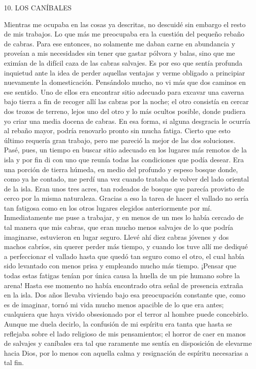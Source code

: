 \documentclass{novela}
\begin{document}
    10. LOS CANÍBALES




    Mientras me ocupaba en las cosas ya descritas, no descuidé sin embargo el resto de mis trabajos. Lo que más me preocupaba era la cuestión del pequeño rebaño de cabras. Para ese entonces, no solamente me daban carne en abundancia y proveían a mis necesidades sin tener que gastar pólvora y balas, sino que me eximían de la difícil caza de las cabras salvajes. Es por eso que sentía profunda inquietud ante la idea de perder aquellas ventajas y verme obligado a principiar nuevamente la domesticación.
    Pensándolo mucho, no vi más que dos caminos en ese sentido. Uno de ellos era encontrar sitio adecuado para excavar una caverna bajo tierra a fin de recoger allí las cabras por la noche; el otro consistía en cercar dos trozos de terreno, lejos uno del otro y lo más ocultos posible, donde pudiera yo criar una media docena de cabras. En esa forma, si alguna desgracia le ocurría al rebaño mayor, podría renovarlo pronto sin mucha fatiga. Cierto que esto último requería gran trabajo, pero me pareció la mejor de las dos soluciones.
    Pasé, pues, un tiempo en buscar sitio adecuado en los lugares más remotos de la isla y por fin di con uno que reunía todas las condiciones que podía desear. Era una porción de tierra húmeda, en medio del profundo y espeso bosque donde, como ya he contado, me perdí una vez cuando trataba de volver del lado oriental de la isla. Eran unos tres acres, tan rodeados de bosque que parecía provisto de cerco por la misma naturaleza. Gracias a eso la tarea de hacer el vallado no sería tan fatigosa como en los otros lugares elegidos anteriormente por mí.
    Inmediatamente me puse a trabajar, y en menos de un mes lo había cercado de tal manera que mis cabras, que eran mucho menos salvajes de lo que podría imaginarse, estuvieron en lugar seguro. Llevé ahí diez cabras jóvenes y dos machos cabríos, sin querer perder más tiempo, y cuando los tuve allí me dediqué a perfeccionar el vallado hasta que quedó tan seguro como el otro, el cual había sido levantado con menos prisa y empleando mucho más tiempo.
    ¡Pensar que todas estas fatigas tenían por única causa la huella de un pie humano sobre la arena! Hasta ese momento no había encontrado otra señal de presencia extraña en la isla. Dos años llevaba viviendo bajo esa preocupación constante que, como es de imaginar, tornó mi vida mucho menos apacible de lo que era antes; cualquiera que haya vivido obsesionado por el terror al hombre puede concebirlo. Aunque me duela decirlo, la confusión de mi espíritu era tanta que hasta se reflejaba sobre el lado religioso de mis pensamientos; el horror de caer en manos de salvajes y caníbales era tal que raramente me sentía en disposición de elevarme hacia Dios, por lo menos con aquella calma y resignación de espíritu necesarias a tal fin.
\end{document}
